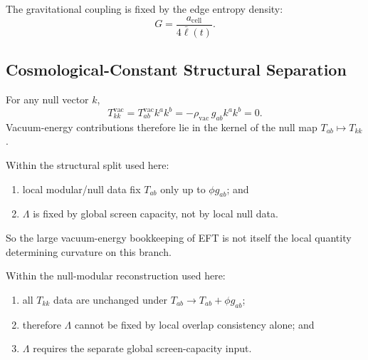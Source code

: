 \begin{theorem}
The gravitational coupling is fixed by the edge entropy density:
\[
G=\frac{a_{\mathrm{cell}}}{4\bar{\ell}(t)}.
\]
\end{theorem}

\subsection{Cosmological-Constant Structural Separation}

\begin{lemma}
For any null vector \(k\),
\[
T^{\mathrm{vac}}_{kk}
=
T^{\mathrm{vac}}_{ab}k^ak^b
=
-\rho_{\mathrm{vac}}\,g_{ab}k^ak^b
=
0.
\]
Vacuum-energy contributions therefore lie in the kernel of the null map
\(T_{ab}\mapsto T_{kk}\).
\end{lemma}

\begin{proposition}
Within the structural split used here:
\begin{enumerate}[leftmargin=2em]
\item local modular/null data fix \(T_{ab}\) only up to \(\phi g_{ab}\); and
\item \(\Lambda\) is fixed by global screen capacity, not by local null data.
\end{enumerate}
So the large vacuum-energy bookkeeping of EFT is not itself the local quantity determining
curvature on this branch.
\end{proposition}

\begin{theorem}
Within the null-modular reconstruction used here:
\begin{enumerate}[leftmargin=2em]
\item all \(T_{kk}\) data are unchanged under \(T_{ab}\to T_{ab}+\phi g_{ab}\);
\item therefore \(\Lambda\) cannot be fixed by local overlap consistency alone; and
\item \(\Lambda\) requires the separate global screen-capacity input.
\end{enumerate}
\end{theorem}

